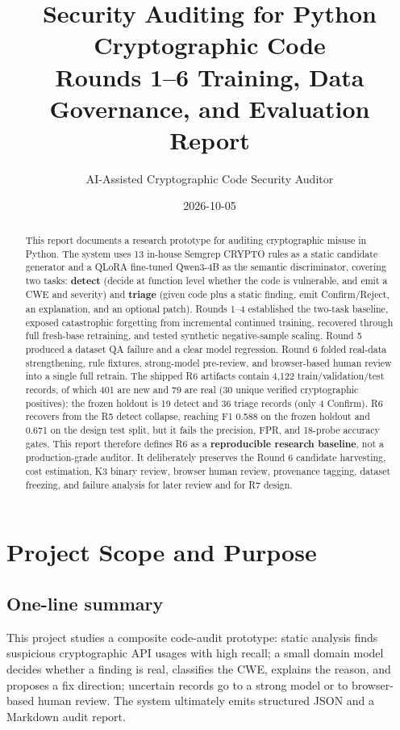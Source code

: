 \documentclass[11pt]{article}
\title{\bfseries Security Auditing for Python Cryptographic Code\\
\large Rounds 1--6 Training, Data Governance, and Evaluation Report}
\author{AI-Assisted Cryptographic Code Security Auditor}
\date{2026-10-05}
\begin{document}
\maketitle
\vspace{-1.2em}

\begin{abstract}
\noindent This report documents a research prototype for auditing cryptographic misuse in Python.
The system uses 13 in-house Semgrep CRYPTO rules as a static candidate generator and a QLoRA fine-tuned
Qwen3-4B as the semantic discriminator, covering two tasks: \textbf{detect} (decide at function level
whether the code is vulnerable, and emit a CWE and severity) and \textbf{triage} (given code plus a static
finding, emit Confirm/Reject, an explanation, and an optional patch). Rounds 1--4 established the two-task
baseline, exposed catastrophic forgetting from incremental continued training, recovered through full
fresh-base retraining, and tested synthetic negative-sample scaling. Round 5 produced a dataset QA failure
and a clear model regression. Round 6 folded real-data strengthening, rule fixtures, strong-model pre-review,
and browser-based human review into a single full retrain. The shipped R6 artifacts contain 4,122
train/validation/test records, of which 401 are new and 79 are real (30 unique verified cryptographic
positives); the frozen holdout is 19 detect and 36 triage records (only 4 Confirm). R6 recovers from the R5
detect collapse, reaching F1 0.588 on the frozen holdout and 0.671 on the design test split, but it fails the
precision, FPR, and 18-probe accuracy gates. This report therefore defines R6 as a \textbf{reproducible
research baseline}, not a production-grade auditor. It deliberately preserves the Round 6 candidate
harvesting, cost estimation, K3 binary review, browser human review, provenance tagging, dataset freezing,
and failure analysis for later review and for R7 design.
\end{abstract}

\tableofcontents

\section{Project Scope and Purpose}

\subsection{One-line summary}

This project studies a composite code-audit prototype: static analysis finds suspicious cryptographic API
usages with high recall; a small domain model decides whether a finding is real, classifies the CWE, explains
the reason, and proposes a fix direction; uncertain records go to a strong model or to browser-based human
review. The system ultimately emits structured JSON and a Markdown audit report.
\end{document}
